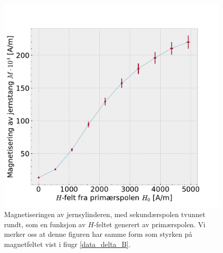 \documentclass[%
 reprint,
 amsmath,amssymb,
 aps,
 norsk,
]{revtex4-1}
\begin{document}
\begin{figure}[h!]
  \centering
  \includegraphics[scale=0.45]{magnetisering.pdf}
  \caption{Magnetiseringen av jernsylinderen, med sekundærspolen tvunnet rundt, som en funksjon av $H$-feltet generert av primærspolen. Vi merker oss at denne figuren har samme form som styrken på magnetfeltet vist i fiugr \vref{data_delta_B}.}
  \label{MH0}
\end{figure}
\end{document}
